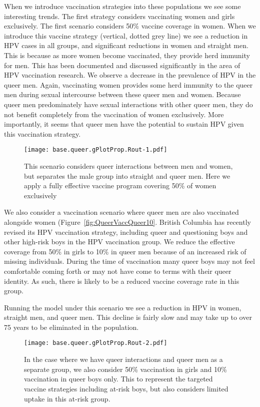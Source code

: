 \documentclass[12pt]{article}
\begin{document}
When we introduce vaccination strategies into these populations we see some interesting trends.  The first strategy considers vaccinating women and girls exclusively.  The first scenario considers 50\% vaccine coverage in women.  When we introduce this vaccine strategy (vertical, dotted grey line) we see a reduction in HPV cases in all groups, and significant reductions in women and straight men.  This is because as more women become vaccinated, they provide herd immunity for men.  This has been documented and discussed significantly in the area of HPV vaccination research.  We observe a decrease in the prevalence of HPV in the queer men.  Again, vaccinating women provides some herd immunity to the queer men during sexual intercourse between these queer men and women.  Because queer men predominately have sexual interactions with other queer men, they do not benefit completely from the vaccination of women exclusively.  More importantly, it seems that queer men have the potential to sustain HPV given this vaccination strategy.

\begin{figure}
\begin{center}
\texttt{[image: base.queer.gPlotProp.Rout-1.pdf]}
\caption{This scenario considers queer interactions between men and women, but separates the male group into straight and queer men.  Here we apply a fully effective vaccine program covering 50\% of women exclusively}
\label{queerVaccWomen50}
\end{center}
\end{figure}

We also consider a vaccination scenario where queer men are also vaccinated alongside women (Figure~\ref{fig:QueerVaccQueer10}.  British Columbia has recently revised its HPV vaccination strategy, including queer and questioning boys and other high-risk boys in the HPV vaccination group.  We reduce the effective coverage from 50\% in girls to 10\% in queer men because of an increased risk of missing individuals.  During the time of vaccination many queer boys may not feel comfortable coming forth or may not have come to terms with their queer identity.  As such, there is likely to be a reduced vaccine coverage rate in this group.

Running the model under this scenario we see a reduction in HPV in women, straight men, and queer men.  This decline is fairly slow and may take up to over 75 years to be eliminated in the population.  

\begin{figure}[h!]
\begin{center}
\texttt{[image: base.queer.gPlotProp.Rout-2.pdf]}
\caption{In the case where we have queer interactions and queer men as a separate group, we also consider 50\% vaccination in girls and 10\% vaccination in queer boys only.  This to represent the targeted vaccine strategies including at-risk boys, but also considers limited uptake in this at-risk group.}
\label{fig:queerVaccQueer10}
\end{center}
\end{figure}
\end{document}
